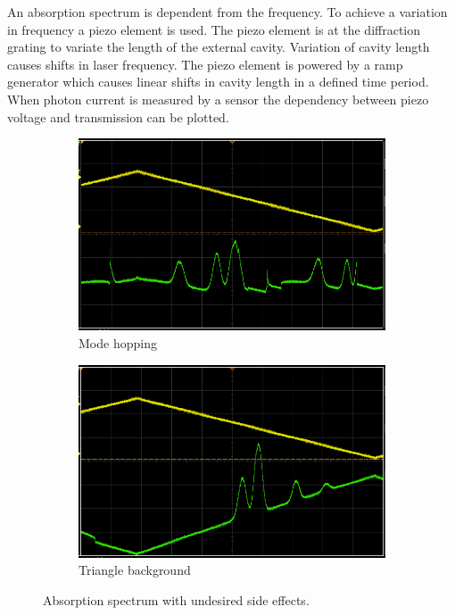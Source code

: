 An absorption spectrum is dependent from the frequency. 
To achieve a variation in frequency a piezo element is used. 
The piezo element is at the diffraction grating to variate the length of the
external cavity. 
Variation of cavity length causes shifts in laser frequency. 
The piezo element is powered by a ramp generator which causes linear shifts in
cavity length in a defined time period.
When photon current is measured by a sensor the dependency between piezo voltage and
transmission can be plotted.
\begin{figure}[h]
		\centering
		\begin{subfigure}[b]{0.49\textwidth}
				\begin{center}
				\includegraphics[width=1.0\linewidth]{./content/pictures/scope_136.png}
						\caption{Mode hopping}%
				\label{fig:piezotest}
				\end{center}
		\end{subfigure}
		\begin{subfigure}[b]{0.49\textwidth}
				\begin{center}
						\includegraphics[width=1.0\linewidth]{./content/pictures/scope_138.png}
						\caption{Triangle background}%
						\label{fig:rectangular}
				\end{center}
		\end{subfigure}
		\caption{Absorption spectrum with undesired side effects.}%
		\label{fig:}
\end{figure}
